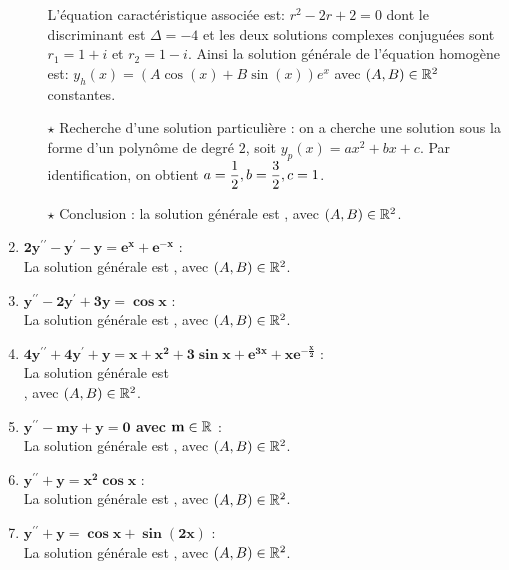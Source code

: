 \documentclass[a4paper, 11pt,reqno]{article}
\begin{document}
\begin{correction}
\begin{enumerate}
\begin{itemize}
L'\'equation caract\'eristique associ\'ee est: $r^2-2r+2=0$ dont le discriminant est $\Delta=-4$ et les deux solutions complexes conjugu\'ees sont $r_1=1+i$ et $r_2=1-i$. Ainsi la solution g\'en\'erale de l'\'equation homog\`{e}ne est: $y_h(x)= (A \cos{(x)}+B \sin{(x)})e^x$ avec $(A,B)\in\mathbb{R}^2$ constantes.
\item[$\star$] Recherche d'une solution particuli\`ere : on a cherche une solution sous la forme d'un polyn\^ome de degr\'e $2$, soit $y_p(x) = a x^2 +bx+c$. Par identification, on obtient $a=\displaystyle \frac{1}{2}, b= \frac{3}{2}, c=1$.
\item[$\star$] Conclusion : la solution g\'en\'erale est , avec $(A,B)\in\mathbb{R}^2$.
\end{itemize}
\item $\mathbf{2y^{\prime\prime}-y^{\prime}-y=e^x+e^{-x}}$ :\\
La solution g\'en\'erale est , avec $(A,B)\in\mathbb{R}^2$.
\item $\mathbf{y^{\prime\prime}-2y^{\prime}+3y=\cos{x}}$ :\\
La solution g\'en\'erale est , avec $(A,B)\in\mathbb{R}^2$.
\item $\mathbf{4y^{\prime\prime}+4y^{\prime}+y=x+x^2+3\sin{x}+e^{3x}+xe^{-\frac{x}{2}}}$ :\\
La solution g\'en\'erale est  \vsec\\
 , avec $(A,B)\in\mathbb{R}^2$.
\item \textbf{$\mathbf{y^{\prime\prime}-my+y=0}$ avec $\mathbf{m\in\mathbb{R}}$} :\\
La solution g\'en\'erale est , avec $(A,B)\in\mathbb{R}^2$.
\item $\mathbf{y^{\prime\prime}+y=x^2\cos{x}}$ :\\
La solution g\'en\'erale est , avec $(A,B)\in\mathbb{R}^2$.
\item $\mathbf{y^{\prime\prime}+y=\cos{x}+\sin{(2x)}}$ :\\
La solution g\'en\'erale est , avec $(A,B)\in\mathbb{R}^2$.
\end{enumerate}
\end{correction}
\end{document}

